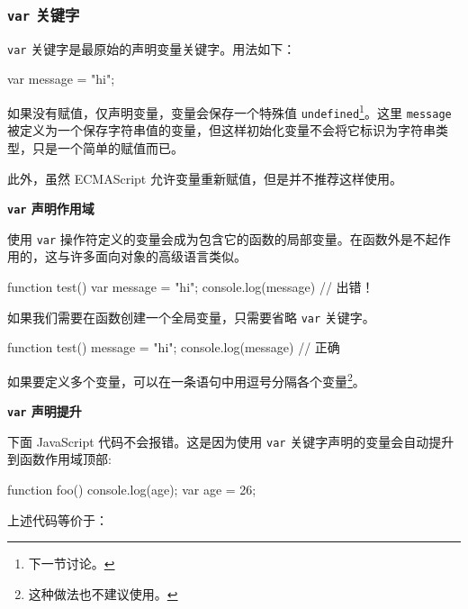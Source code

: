 \subsubsection{\texttt{var} 关键字}

\texttt{var} 关键字是最原始的声明变量关键字。用法如下：

\begin{JavaScript}
var message = "hi";
\end{JavaScript}

如果没有赋值，仅声明变量，变量会保存一个特殊值 \texttt{undefined}\footnote{下一节讨论。}。这里 \texttt{message} 被定义为一个保存字符串值的变量，但这样初始化变量不会将它标识为字符串类型，只是一个简单的赋值而已。

此外，虽然 ECMAScript 允许变量重新赋值，但是并不推荐这样使用。

\noindent\textbf{\texttt{var} 声明作用域}

使用 \texttt{var} 操作符定义的变量会成为包含它的函数的局部变量。在函数外是不起作用的，这与许多面向对象的高级语言类似。

\begin{JavaScript}
function test() {
    var message = "hi";
}
console.log(message)    // 出错！
\end{JavaScript}

如果我们需要在函数创建一个全局变量，只需要省略 \texttt{var} 关键字。

\begin{JavaScript}
function test() {
    message = "hi";
}
console.log(message)    // 正确
\end{JavaScript}


如果要定义多个变量，可以在一条语句中用逗号分隔各个变量\footnote{这种做法也不建议使用。}。

\noindent\textbf{\texttt{var} 声明提升}

下面 JavaScript 代码不会报错。这是因为使用 \texttt{var} 关键字声明的变量会自动提升到函数作用域顶部:

\begin{JavaScript}
function foo() {
    console.log(age);
    var age = 26;
}
\end{JavaScript}

上述代码等价于：

